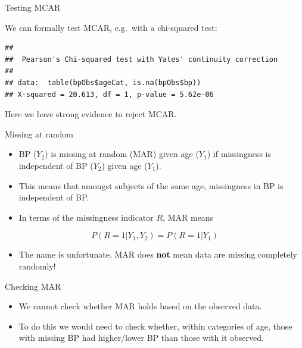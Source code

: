 \documentclass[ignorenonframetext,]{beamer}
\newenvironment{Shaded}{\begin{snugshade}}{\end{snugshade}}
\newcommand{\KeywordTok}[1]{\textcolor[rgb]{0.13,0.29,0.53}{\textbf{#1}}}
\newcommand{\NormalTok}[1]{#1}
\newcommand{\OperatorTok}[1]{\textcolor[rgb]{0.81,0.36,0.00}{\textbf{#1}}}
\providecommand{\tightlist}{%
  \setlength{\itemsep}{0pt}\setlength{\parskip}{0pt}}
\begin{document}
\begin{frame}[fragile]{Testing MCAR}
\protect\hypertarget{testing-mcar}{}

We can formally test MCAR, e.g.~with a chi-squared test:

\small

\begin{Shaded}
\end{Shaded}

\begin{verbatim}
## 
##  Pearson's Chi-squared test with Yates' continuity correction
## 
## data:  table(bpObs$ageCat, is.na(bpObs$bp))
## X-squared = 20.613, df = 1, p-value = 5.62e-06
\end{verbatim}

\normalsize

Here we have strong evidence to reject MCAR.

\end{frame}

\begin{frame}{Missing at random}
\protect\hypertarget{missing-at-random}{}

\begin{itemize}
\tightlist
\item
  BP (\(Y_{2}\)) is missing at random (MAR) given age (\(Y_{1}\)) if
  missingness is independent of BP (\(Y_{2}\)) given age (\(Y_{1}\)).
\item
  This means that amongst subjects of the same age, missingness in BP is
  independent of BP.
\item
  In terms of the missingness indicator \(R\), MAR means
\end{itemize}

\[P(R=1|Y_{1},Y_{2})=P(R=1|Y_{1})\]

\begin{itemize}
\tightlist
\item
  The name is unfortunate. MAR does \textbf{not} mean data are missing
  completely randomly!
\end{itemize}

\end{frame}

\begin{frame}{Checking MAR}
\protect\hypertarget{checking-mar}{}

\begin{itemize}
\tightlist
\item
  We cannot check whether MAR holds based on the observed data.
\item
  To do this we would need to check whether, within categories of age,
  those with missing BP had higher/lower BP than those with it observed.
\end{itemize}

\end{frame}
\end{document}
